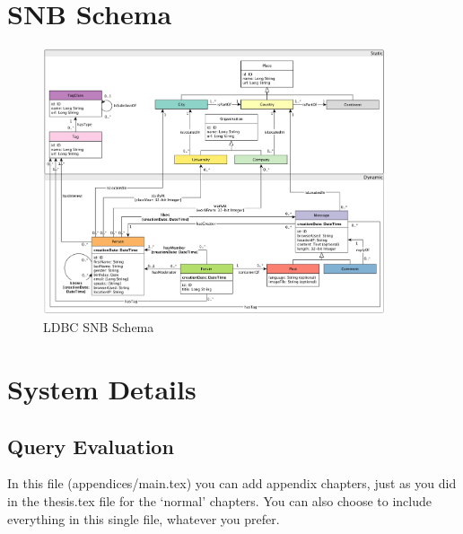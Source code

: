 \chapter{SNB Schema} \label{sec:schema}
\begin{figure}[ht]
    \centering
    \includegraphics[width=0.9\textwidth]{figures/LDBC-Schema}
    \caption{LDBC SNB Schema}
    \label{fig:ldbcSchema}
\end{figure}

\chapter{System Details}
\section{Query Evaluation}\label{sec:queryEvaluation}

In this file (appendices/main.tex) you can add appendix chapters, just as you did in the thesis.tex file for the `normal' chapters.
You can also choose to include everything in this single file, whatever you prefer.
